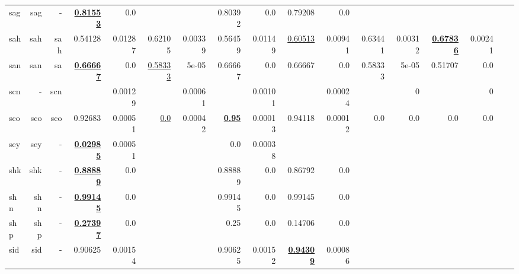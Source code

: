 \documentclass[11pt]{article}
\begin{document}
\begin{table*}[h]
{\begin{tabular}{lrrrrrrrrrrrrrrrr}
sag         & sag         & -         & \textbf{\underline{0.81553}}         & 0.0         &          &          & 0.80392         & 0.0         & 0.79208         & 0.0         &          &          &          &          \\
sah         & sah         & sah         & 0.54128         & 0.01287         & 0.62105         & 0.00339         & 0.56459         & 0.01149         & \underline{0.60513}         & 0.00941         & 0.63441         & 0.00312         & \textbf{\underline{0.67836}}         & 0.00241         \\
san         & san         & sa         & \textbf{\underline{0.66667}}         & 0.0         & \underline{0.58333}         & 5e-05         & 0.66667         & 0.0         & 0.66667         & 0.0         & 0.58333         & 5e-05         & 0.51707         & 0.0         \\
scn         & -         & scn         &          & 0.00129         &          & 0.00061         &          & 0.00101         &          & 0.00024         &          & 0         &          & 0         \\
sco         & sco         & sco         & 0.92683         & 0.00051         & \underline{0.0}         & 0.00042         & \textbf{\underline{0.95}}         & 0.00013         & 0.94118         & 0.00012         & 0.0         & 0.0         & 0.0         & 0.0         \\
sey         & sey         & -         & \textbf{\underline{0.02985}}         & 0.00051         &          &          & 0.0         & 0.00038         &          &          &          &          &          &          \\
shk         & shk         & -         & \textbf{\underline{0.88889}}         & 0.0         &          &          & 0.88889         & 0.0         & 0.86792         & 0.0         &          &          &          &          \\
shn         & shn         & -         & \textbf{\underline{0.99145}}         & 0.0         &          &          & 0.99145         & 0.0         & 0.99145         & 0.0         &          &          &          &          \\
shp         & shp         & -         & \textbf{\underline{0.27397}}         & 0.0         &          &          & 0.25         & 0.0         & 0.14706         & 0.0         &          &          &          &          \\
sid         & sid         & -         & 0.90625         & 0.00154         &          &          & 0.90625         & 0.00152         & \textbf{\underline{0.94309}}         & 0.00086         &          &          &          &          \\

\end{tabular}}
\end{table*}
\end{document}
